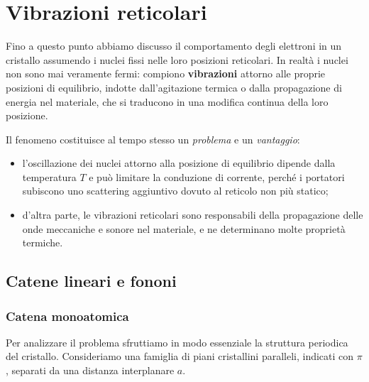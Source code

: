 \chapter{Vibrazioni reticolari}

Fino a questo punto abbiamo discusso il comportamento degli elettroni in un cristallo assumendo i nuclei fissi nelle loro posizioni reticolari. In realtà i nuclei non sono mai veramente fermi: compiono \textbf{vibrazioni} attorno alle proprie posizioni di equilibrio, indotte dall'agitazione termica o dalla propagazione di energia nel materiale, che si traducono in una modifica continua della loro posizione.

Il fenomeno costituisce al tempo stesso un \emph{problema} e un \emph{vantaggio}:

\begin{itemize}
    \item l'oscillazione dei nuclei attorno alla posizione di equilibrio dipende dalla temperatura \( T \) e può limitare la conduzione di corrente, perché i portatori subiscono uno scattering aggiuntivo dovuto al reticolo non più statico;
    \item d'altra parte, le vibrazioni reticolari sono responsabili della propagazione delle onde meccaniche e sonore nel materiale, e ne determinano molte proprietà termiche.
\end{itemize}

\section{Catene lineari e fononi}

\subsection{Catena monoatomica}

Per analizzare il problema sfruttiamo in modo essenziale la struttura periodica del cristallo. Consideriamo una famiglia di piani cristallini paralleli, indicati con \( \pi \), separati da una distanza interplanare \( a \).

